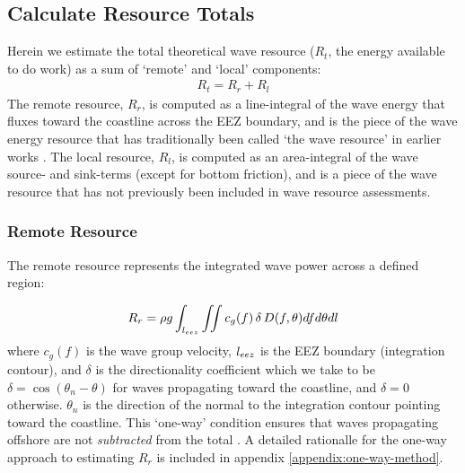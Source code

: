 \subsection{Calculate Resource Totals} \label{sec:method:calc}

Herein we estimate the total theoretical wave resource ($R_t$, the energy available to do work) as a sum of `remote' and `local' components:
\begin{align}
  R_t = R_r + R_l
\end{align}
The remote resource, $R_r$, is computed as a line-integral of the wave energy that fluxes toward the coastline across the EEZ boundary, and is the piece of the wave energy resource that has traditionally been called `the wave resource' in earlier works \citep{gunnQuantifyingGlobalWave2012,EPRIwaveresource2011}. The local resource, $R_l$, is computed as an area-integral of the wave source- and sink-terms (except for bottom friction), and is a piece of the wave resource that has not previously been included in wave resource assessments.

\subsubsection{Remote Resource} \label{sec:method:calc:remote}

The remote resource represents the integrated wave power across a defined region:

\begin{align}\label{eq:remoteResource}
  R_r = \rho g \int_{l_{eez}}\iint c_g(f) \, \delta \, D(f,\theta) df d\theta dl
\end{align}
where $c_g(f)$ is the wave group velocity, $l_{eez}$ is the EEZ boundary (integration contour), and $\delta$ is the directionality coefficient which we take to be $\delta = \cos(\theta_n - \theta)$ for waves propagating toward the coastline, and $\delta = 0$ otherwise. $\theta_n$ is the direction of the normal to the integration contour pointing toward the coastline. This `one-way' condition ensures that waves propagating offshore are not {\em subtracted} from the total \citep[]{gunnQuantifyingGlobalWave2012}. A detailed rationalle for the one-way approach to estimating $R_r$ is included in appendix \ref{appendix:one-way-method}.

